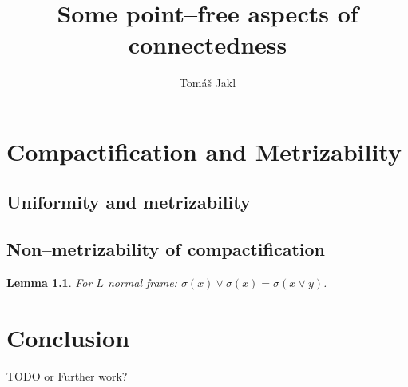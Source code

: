\documentclass[12pt,a4paper]{report}
\title{Some point--free aspects of connectedness}
\author{Tom\'a\v s Jakl}
\newcounter{thmCounter}[section]
\theoremstyle{newthmstyle}
\newtheorem{lemma}[thmCounter]{Lemma}
\theoremstyle{newthmstyleNormal}
\begin{document}
\maketitle
\tableofcontents







\chapter{Compactification and Metrizability}
\section{Uniformity and metrizability}
\section{Non--metrizability of compactification}
\begin{lemma}
    For $L$ normal frame: $\sigma(x)\vee\sigma(x) = \sigma(x\vee y)$.
\end{lemma}

\chapter{Conclusion}
TODO or Further work?





\clearpage
\printindex
\end{document}
